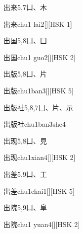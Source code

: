 \begin{entry}{出来}{5,7}{⼐、⽊}
  \begin{phonetics}{出来}{chu1 lai2}[][HSK 1]
  \end{phonetics}
\end{entry}

\begin{entry}{出国}{5,8}{⼐、⼞}
  \begin{phonetics}{出国}{chu1 guo2}[][HSK 2]
  \end{phonetics}
\end{entry}

\begin{entry}{出版}{5,8}{⼐、⽚}
  \begin{phonetics}{出版}{chu1ban3}[][HSK 5]
  \end{phonetics}
\end{entry}

\begin{entry}{出版社}{5,8,7}{⼐、⽚、⽰}
  \begin{phonetics}{出版社}{chu1ban3she4}
  \end{phonetics}
\end{entry}

\begin{entry}{出现}{5,8}{⼐、⾒}
  \begin{phonetics}{出现}{chu1xian4}[][HSK 2]
  \end{phonetics}
\end{entry}

\begin{entry}{出差}{5,9}{⼐、⼯}
  \begin{phonetics}{出差}{chu1chai1}[][HSK 5]
  \end{phonetics}
\end{entry}

\begin{entry}{出院}{5,9}{⼐、⾩}
  \begin{phonetics}{出院}{chu1 yuan4}[][HSK 2]
  \end{phonetics}
\end{entry}

